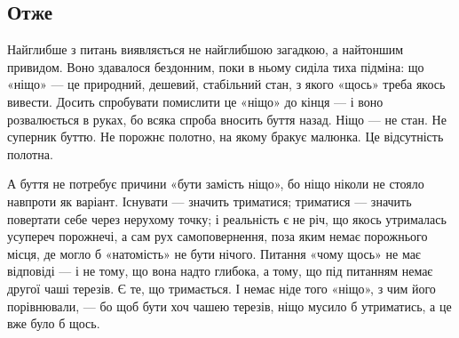 \documentclass[12pt, a4paper, openany]{book}
\begin{document}
\subsection{Отже}

Найглибше з питань виявляється не найглибшою загадкою, а найтоншим привидом. Воно здавалося бездонним, поки в ньому сиділа тиха підміна: що «ніщо» --- це природний, дешевий, стабільний стан, з якого «щось» треба якось вивести. Досить спробувати помислити це «ніщо» до кінця --- і воно розвалюється в руках, бо всяка спроба вносить буття назад. Ніщо --- не стан. Не суперник буттю. Не порожнє полотно, на якому бракує малюнка. Це відсутність полотна.

А буття не потребує причини «бути замість ніщо», бо ніщо ніколи не стояло навпроти як варіант. Існувати --- значить триматися; триматися --- значить повертати себе через нерухому точку; і реальність є не річ, що якось утрималась усупереч порожнечі, а сам рух самоповернення, поза яким немає порожнього місця, де могло б «натомість» не бути нічого. Питання «чому щось» не має відповіді --- і не тому, що вона надто глибока, а тому, що під питанням немає другої чаші терезів. Є те, що тримається. І немає ніде того «ніщо», з чим його порівнювали, --- бо щоб бути хоч чашею терезів, ніщо мусило б утриматись, а це вже було б щось.
\end{document}
